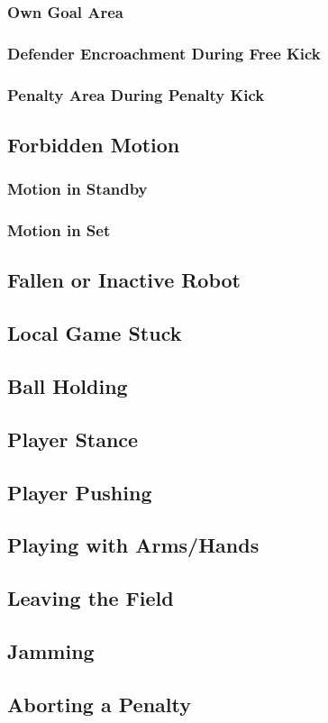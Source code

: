 \subsubsection{Own Goal Area}
\subsubsection{Defender Encroachment During Free Kick}
\subsubsection{Penalty Area During Penalty Kick}

\subsection{Forbidden Motion}
\label{sec:forbidden_motion}

\subsubsection{Motion in Standby}
\subsubsection{Motion in Set}

\subsection{Fallen or Inactive Robot}
\label{sec:fallen_robot}

\subsection{Local Game Stuck}
\label{sec:local_game_stuck}

\subsection{Ball Holding}
\label{sec:ball_holding}

\subsection{Player Stance}
\label{sec:player_stance}

\subsection{Player Pushing}
\label{sec:player_pushing}

\subsection{Playing with Arms/Hands}
\label{sec:playing_with_hands}

\subsection{Leaving the Field}
\label{sec:leaving_the_field}

\subsection{Jamming}
\label{sec:jamming}

\subsection{Aborting a Penalty}
\label{sec:aborting_penalty}
